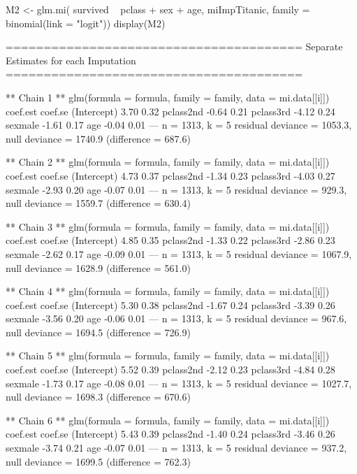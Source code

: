 \begin{Schunk}
\begin{Sinput}
 M2 <- glm.mi( survived ~ pclass + sex + age, miImpTitanic, family = binomial(link = "logit"))  
 display(M2)
\end{Sinput}
\begin{Soutput}
=======================================
Separate Estimates for each Imputation
=======================================

** Chain 1 **
glm(formula = formula, family = family, data = mi.data[[i]])
            coef.est coef.se
(Intercept)  3.70     0.32  
pclass2nd   -0.64     0.21  
pclass3rd   -4.12     0.24  
sexmale     -1.61     0.17  
age         -0.04     0.01  
---
  n = 1313, k = 5
  residual deviance = 1053.3, null deviance = 1740.9 (difference = 687.6)

** Chain 2 **
glm(formula = formula, family = family, data = mi.data[[i]])
            coef.est coef.se
(Intercept)  4.73     0.37  
pclass2nd   -1.34     0.23  
pclass3rd   -4.03     0.27  
sexmale     -2.93     0.20  
age         -0.07     0.01  
---
  n = 1313, k = 5
  residual deviance = 929.3, null deviance = 1559.7 (difference = 630.4)

** Chain 3 **
glm(formula = formula, family = family, data = mi.data[[i]])
            coef.est coef.se
(Intercept)  4.85     0.35  
pclass2nd   -1.33     0.22  
pclass3rd   -2.86     0.23  
sexmale     -2.62     0.17  
age         -0.09     0.01  
---
  n = 1313, k = 5
  residual deviance = 1067.9, null deviance = 1628.9 (difference = 561.0)

** Chain 4 **
glm(formula = formula, family = family, data = mi.data[[i]])
            coef.est coef.se
(Intercept)  5.30     0.38  
pclass2nd   -1.67     0.24  
pclass3rd   -3.39     0.26  
sexmale     -3.56     0.20  
age         -0.06     0.01  
---
  n = 1313, k = 5
  residual deviance = 967.6, null deviance = 1694.5 (difference = 726.9)

** Chain 5 **
glm(formula = formula, family = family, data = mi.data[[i]])
            coef.est coef.se
(Intercept)  5.52     0.39  
pclass2nd   -2.12     0.23  
pclass3rd   -4.84     0.28  
sexmale     -1.73     0.17  
age         -0.08     0.01  
---
  n = 1313, k = 5
  residual deviance = 1027.7, null deviance = 1698.3 (difference = 670.6)

** Chain 6 **
glm(formula = formula, family = family, data = mi.data[[i]])
            coef.est coef.se
(Intercept)  5.43     0.39  
pclass2nd   -1.40     0.24  
pclass3rd   -3.46     0.26  
sexmale     -3.74     0.21  
age         -0.07     0.01  
---
  n = 1313, k = 5
  residual deviance = 937.2, null deviance = 1699.5 (difference = 762.3)


\end{Soutput}
\end{Schunk}
